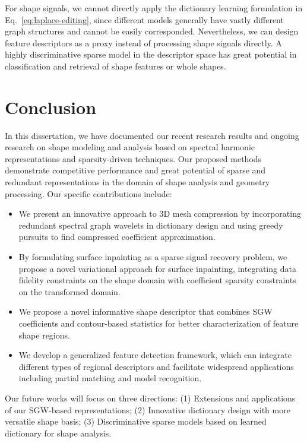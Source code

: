 For shape signals, we cannot directly apply the dictionary learning formulation in
Eq.~\ref{eq:laplace-editing}, since different models generally have vastly different
graph structures and cannot be easily corresponded. Nevertheless, we can design feature
descriptors as a proxy instead of processing shape signals directly. A highly discriminative
sparse model in the descriptor space has great potential in classification and retrieval of
shape features or whole shapes.

\section{Conclusion}
In this dissertation, we have documented our recent research results and ongoing research
on shape modeling and analysis based on spectral harmonic representations and
sparsity-driven techniques. Our proposed methods demonstrate competitive performance
and great potential of sparse and redundant representations in the domain of shape analysis
and geometry processing. Our specific contributions include:

\begin{itemize}
\item We present an innovative approach to 3D mesh compression
by incorporating redundant spectral graph wavelets in dictionary design and using
greedy pursuits to find compressed coefficient approximation.

\item By formulating surface inpainting as a sparse signal recovery problem,
we propose a novel variational approach for surface inpainting, integrating data fidelity
constraints on the shape domain with coefficient sparsity constraints on the
transformed domain.

\item We propose a novel informative shape descriptor that combines SGW coefficients and
contour-based statistics for better characterization of feature shape regions.

\item We develop a generalized feature detection framework, which can integrate different
types of regional descriptors and facilitate widespread applications including partial matching and
model recognition.

\end{itemize}

Our future works will focus on three directions: (1) Extensions and applications of
our SGW-based representations; (2) Innovative dictionary design with more versatile
shape basis; (3) Discriminative sparse models based on learned dictionary for shape analysis.
